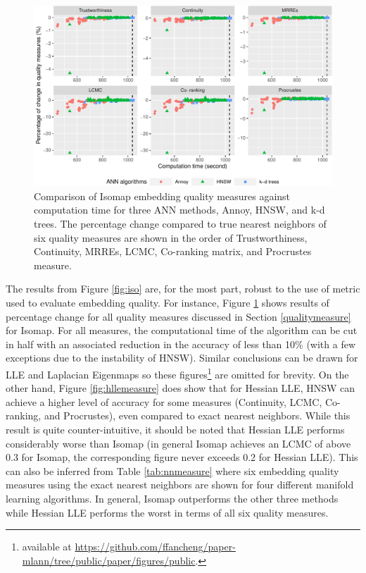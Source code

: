 \documentclass[12pt]{article}
\begin{document}
\begin{figure}

{\centering \includegraphics[width=1\linewidth]{mlann_jcgs_files/figure-latex/iso6measure-1} 

}

\caption{Comparison of Isomap embedding quality measures against computation time for three ANN methods, Annoy, HNSW, and k-d trees. The percentage change compared to true nearest neighbors of six quality measures are shown in the order of Trustworthiness, Continuity, MRREs, LCMC, Co-ranking matrix, and Procrustes measure. }\label{fig:iso6measure}
\end{figure}

The results from Figure \ref{fig:iso} are, for the most part, robust to the use of metric used to evaluate embedding quality. For instance, Figure \ref{fig:iso6measure} shows results of percentage change for all quality measures discussed in Section \ref{qualitymeasure} for Isomap. For all measures, the computational time of the algorithm can be cut in half with an associated reduction in the accuracy of less than 10\% (with a few exceptions due to the instability of HNSW). Similar conclusions can be drawn for LLE and Laplacian Eigenmaps so these figures\footnote{available at \url{https://github.com/ffancheng/paper-mlann/tree/public/paper/figures/public}.} are omitted for brevity.
On the other hand, Figure \ref{fig:hllemeasure} does show that for Hessian LLE, HNSW can achieve a higher level of accuracy for some measures (Continuity, LCMC, Co-ranking, and Procrustes), even compared to exact nearest neighbors. While this result is quite counter-intuitive, it should be noted that Hessian LLE performs considerably worse than Isomap (in general Isomap achieves an LCMC of above 0.3 for Isomap, the corresponding figure never exceeds 0.2 for Hessian LLE).
This can also be inferred from Table \ref{tab:nnmeasure} where six embedding quality measures using the exact nearest neighbors are shown for four different manifold learning algorithms. In general, Isomap outperforms the other three methods while Hessian LLE performs the worst in terms of all six quality measures.
\end{document}
